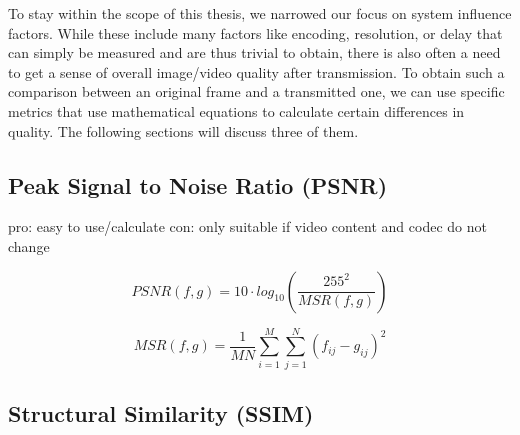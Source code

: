 To stay within the scope of this thesis, we narrowed our focus on system influence factors. While these include many factors like encoding, resolution, or delay that can simply be measured and are thus trivial to obtain, there is also often a need to get a sense of overall image/video quality after transmission. To obtain such a comparison between an original frame and a transmitted one, we can use specific metrics that use mathematical equations to calculate certain differences in quality. The following sections will discuss three of them. 




%



\subsection{Peak Signal to Noise Ratio (PSNR)}
pro: easy to use/calculate
con: only suitable if video content and codec do not change \cite{HuGh08}

\begin{equation}
PSNR (f,g) = 10 \cdot log_{10}\left(\dfrac{255^{2}}{MSR(f,g)}\right)
\label{equation:metrics:PSNR_1}
\end{equation}

\begin{equation}
MSR(f,g) = \dfrac{1}{MN}\sum_{i=1}^{M}\sum_{j=1}^{N}(f_{ij}-g_{ij})^{2}
\label{equation:metrics:PSNR_2}
\end{equation}

\subsection{Structural Similarity (SSIM)}


